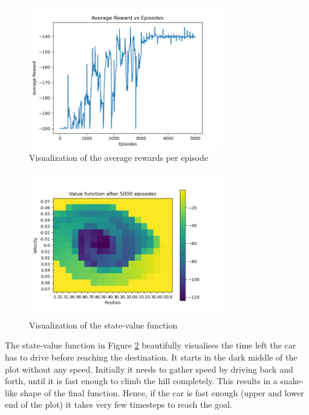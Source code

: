 \documentclass{article}
\begin{document}
\begin{figure}
    \centering
    \includegraphics[width=0.75\textwidth]{rewards.png}
    \caption{Visualization of the average rewards per episode}
    \label{fig:average_rewards}
\end{figure}

\begin{figure}
    \centering
    \includegraphics[width=0.75\textwidth]{state-value-function.png}
    \caption{Visualization of the state-value function}
    \label{fig:state-value-function}
\end{figure}

The state-value function in Figure \ref{fig:state-value-function} beautifully visualises the time left the car has to drive before reaching the destination. It starts in the dark middle of the plot without any speed. Initially it needs to gather speed by driving back and forth, until it is fast enough to climb the hill completely. This results in a snake-like shape of the final function. Hence, if the car is fast enough (upper and lower end of the plot) it takes very few timesteps to reach the goal.
\end{document}
